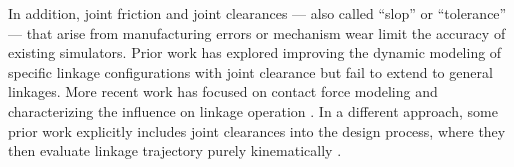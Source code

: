 In addition, joint friction and joint clearances --- also called ``slop'' or ``tolerance'' --- that arise from manufacturing errors or mechanism wear limit the accuracy of existing simulators. Prior work has explored improving the dynamic modeling of specific linkage configurations with joint clearance \cite{funabashi_dynamic_1978, soong_theoretical_1990} but fail to extend to general linkages.  More recent work has focused on contact force modeling and characterizing the influence on linkage operation \cite{akhadkar_influence_2014, tan_continuous_2017}. In a different approach, some prior work explicitly includes joint clearances into the design process, where they then evaluate linkage trajectory purely kinematically  \cite{mutawe_designing_2012, qi_synthesis_2023}.


